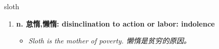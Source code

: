 
\begin{frame}
{\huge sloth}
\begin{center}
\begin{enumerate}\Large
  \item \textbf{n. 怠惰,懒惰: disinclination to action or labor: indolence}
  \begin{itemize}
    \item \em{\Large{Sloth is the mother of poverty. 懒惰是贫穷的原因。}}
  \end{itemize}
\end{enumerate}
\end{center}
\end{frame}
